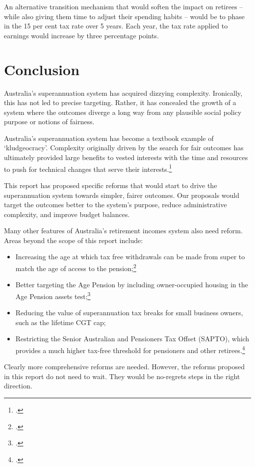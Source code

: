 \documentclass{grattanAlpha}
\begin{document}
An alternative transition mechanism that would soften the impact on retirees – while also giving them time to adjust their spending habits – would be to phase in the 15 per cent tax rate over 5 years. Each year, the tax rate applied to earnings would increase by three percentage points.

\chapter{Conclusion}
Australia’s superannuation system has acquired dizzying complexity. Ironically, this has not led to precise targeting. Rather, it has concealed the growth of a system where the outcomes diverge a long way from any plausible social policy purpose or notions of fairness.

Australia’s superannuation system has become a textbook example of ‘kludgeocracy’. Complexity originally driven by the search for fair outcomes has ultimately provided large benefits to vested interests with the time and resources to push for technical changes that serve their interests.\footcite{Teles2013} 

This report has proposed specific reforms that would start to drive the superannuation system towards simpler, fairer outcomes. Our proposals would target the outcomes better to the system’s purpose, reduce administrative complexity, and improve budget balances.

Many other features of Australia’s retirement incomes system also need reform. Areas beyond the scope of this report include: 
\begin{itemize}
\item	Increasing the age at which tax free withdrawals can be made from super to match the age of access to the pension;\footcite[][29]{DaleyMcGannonSavageEtAl2013BalancingBudgets} 
\item	Better targeting the Age Pension by including owner-occupied housing in the Age Pension assets test;\footcite[][37]{DaleyMcGannonSavageEtAl2013BalancingBudgets} 
\item	Reducing the value of superannuation tax breaks for small business owners, such as the lifetime CGT cap; 
\item	Restricting the Senior Australian and Pensioners Tax Offset (SAPTO), which provides a much higher tax-free threshold for pensioners and other retirees.\footcite{ACOSS2015--Sub-to-Govt-Retirement-Incomes-Review} 
\end{itemize} 
Clearly more comprehensive reforms are needed. However, the reforms proposed in this report do not need to wait. They would be no-regrets steps in the right direction. 
\end{document}
